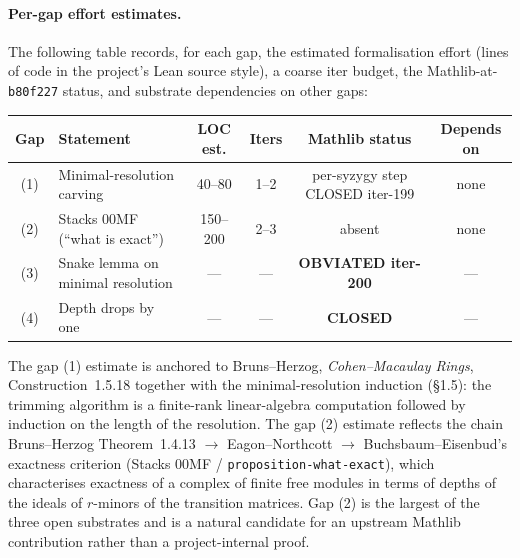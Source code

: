 \paragraph{Per-gap effort estimates.} The following table records,
for each gap, the estimated formalisation effort (lines of code in
the project's Lean source style), a coarse iter budget, the
Mathlib-at-\texttt{b80f227} status, and substrate dependencies on
other gaps:
\begin{center}
  \begin{tabular}{|c|l|c|c|c|c|}
    \hline
    Gap & Statement                              & LOC est.  & Iters
        & Mathlib status     & Depends on \\
    \hline
    (1) & Minimal-resolution carving             & 40--80    & 1--2
        & per-syzygy step CLOSED iter-199
                                                                & none \\
    (2) & Stacks 00MF (``what is exact'')        & 150--200  & 2--3
        & absent             & none \\
    (3) & Snake lemma on minimal resolution      & ---       & ---
        & \textbf{OBVIATED iter-200} & --- \\
    (4) & Depth drops by one                     & ---       & ---
        & \textbf{CLOSED}    & --- \\
    \hline
  \end{tabular}
\end{center}
The gap (1) estimate is anchored to Bruns--Herzog,
\emph{Cohen--Macaulay Rings}, Construction~1.5.18 together with the
minimal-resolution induction (\S1.5): the trimming algorithm is a
finite-rank linear-algebra computation followed by induction on the
length of the resolution. The gap (2) estimate reflects the chain
Bruns--Herzog Theorem~1.4.13 \(\to\) Eagon--Northcott
\(\to\) Buchsbaum--Eisenbud's exactness criterion (Stacks 00MF /
\texttt{proposition-what-exact}), which characterises exactness of a
complex of finite free modules in terms of depths of the ideals of
\(r\)-minors of the transition matrices. Gap (2) is the largest of
the three open substrates and is a natural candidate for an upstream
Mathlib contribution rather than a project-internal proof.


